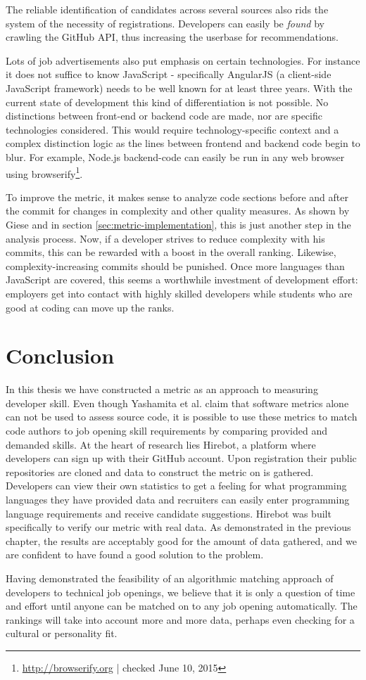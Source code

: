 The reliable identification of candidates across several sources also rids the system of the necessity of registrations. Developers can easily be \textit{found} by crawling the GitHub API, thus increasing the userbase for recommendations.


Lots of job advertisements also put emphasis on certain technologies. For instance it does not suffice to know JavaScript - specifically AngularJS (a client-side JavaScript framework) needs to be well known for at least three years. With the current state of development this kind of differentiation is not possible. No distinctions between front-end or backend code are made, nor are specific technologies considered. This would require technology-specific context and a complex distinction logic as the lines between frontend and backend code begin to blur. For example, Node.js backend-code can easily be run in any web browser using browserify\footnote{\url{http://browserify.org} | checked June 10, 2015}.
\newline

To improve the metric, it makes sense to analyze code sections before and after the commit for changes in complexity and other quality measures. As shown by Giese \cite{pg:2014} and in section \ref{sec:metric-implementation}, this is just another step in the analysis process. Now, if a developer strives to reduce complexity with his commits, this can be rewarded with a boost in the overall ranking. Likewise, complexity-increasing commits should be punished. Once more languages than JavaScript are covered, this seems a worthwhile investment of development effort: employers get into contact with highly skilled developers while students who are good at coding can move up the ranks.

\section{Conclusion}
In this thesis we have constructed a metric as an approach to measuring developer skill. Even though Yashamita et al. claim that software metrics alone can not be used to assess source code\cite{mlya:2012}, it is possible to use these metrics to match code authors to job opening skill requirements by comparing provided and demanded skills. At the heart of research lies Hirebot, a platform where developers can sign up with their GitHub account. Upon registration their public repositories are cloned and data to construct the metric on is gathered. Developers can view their own statistics to get a feeling for what programming languages they have provided data and recruiters can easily enter programming language requirements and receive candidate suggestions. Hirebot was built specifically to verify our metric with real data. As demonstrated in the previous chapter, the results are acceptably good for the amount of data gathered, and we are confident to have found a good solution to the problem.

Having demonstrated the feasibility of an algorithmic matching approach of developers to technical job openings, we believe that it is only a question of time and effort until anyone can be matched on to any job opening automatically. The rankings will take into account more and more data, perhaps even checking for a cultural or personality fit.